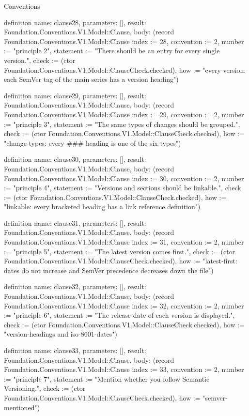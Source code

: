 \begin{lexlean}{Conventions}
\begin{semanticmodule}
definition{
  name: clause28,
  parameters: [],
  result: Foundation.Conventions.V1.Model::Clause,
  body: (record Foundation.Conventions.V1.Model::Clause {index := 28, convention := 2, number := "principle 2", statement := "There should be an entry for every single version.", check := (ctor Foundation.Conventions.V1.Model::ClauseCheck.checked), how := "every-version: each SemVer tag of the main series has a version heading"})
}

definition{
  name: clause29,
  parameters: [],
  result: Foundation.Conventions.V1.Model::Clause,
  body: (record Foundation.Conventions.V1.Model::Clause {index := 29, convention := 2, number := "principle 3", statement := "The same types of changes should be grouped.", check := (ctor Foundation.Conventions.V1.Model::ClauseCheck.checked), how := "change-types: every ### heading is one of the six types"})
}

definition{
  name: clause30,
  parameters: [],
  result: Foundation.Conventions.V1.Model::Clause,
  body: (record Foundation.Conventions.V1.Model::Clause {index := 30, convention := 2, number := "principle 4", statement := "Versions and sections should be linkable.", check := (ctor Foundation.Conventions.V1.Model::ClauseCheck.checked), how := "linkable: every bracketed heading has a link reference definition"})
}

definition{
  name: clause31,
  parameters: [],
  result: Foundation.Conventions.V1.Model::Clause,
  body: (record Foundation.Conventions.V1.Model::Clause {index := 31, convention := 2, number := "principle 5", statement := "The latest version comes first.", check := (ctor Foundation.Conventions.V1.Model::ClauseCheck.checked), how := "latest-first: dates do not increase and SemVer precedence decreases down the file"})
}

definition{
  name: clause32,
  parameters: [],
  result: Foundation.Conventions.V1.Model::Clause,
  body: (record Foundation.Conventions.V1.Model::Clause {index := 32, convention := 2, number := "principle 6", statement := "The release date of each version is displayed.", check := (ctor Foundation.Conventions.V1.Model::ClauseCheck.checked), how := "version-headings and iso-8601-dates"})
}

definition{
  name: clause33,
  parameters: [],
  result: Foundation.Conventions.V1.Model::Clause,
  body: (record Foundation.Conventions.V1.Model::Clause {index := 33, convention := 2, number := "principle 7", statement := "Mention whether you follow Semantic Versioning.", check := (ctor Foundation.Conventions.V1.Model::ClauseCheck.checked), how := "semver-mentioned"})
}


\end{semanticmodule}
\end{lexlean}
